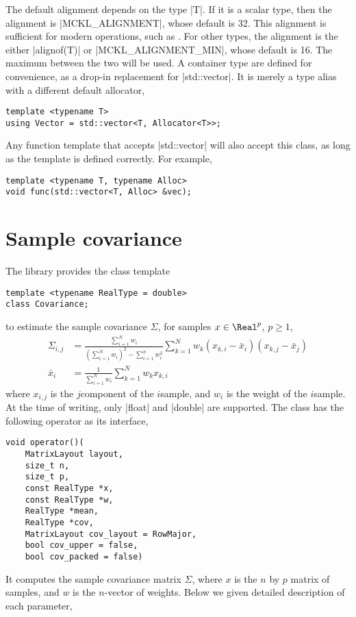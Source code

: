The default alignment depends on the type |T|. If it is a scalar type, then the
alignment is |MCKL_ALIGNMENT|, whose default is 32. This alignment is
sufficient for modern \simd operations, such as \avx. For other types, the
alignment is the either |alignof(T)| or |MCKL_ALIGNMENT_MIN|, whose default is
16. The maximum between the two will be used. A container type are defined for
convenience, as a drop-in replacement for |std::vector|. It is merely a type
alias with a different default allocator,
\begin{verbatim}
template <typename T>
using Vector = std::vector<T, Allocator<T>>;
\end{verbatim}
Any function template that accepts |std::vector| will also accept this class,
as long as the template is defined correctly. For example,
\begin{verbatim}
template <typename T, typename Alloc>
void func(std::vector<T, Alloc> &vec);
\end{verbatim}

\section{Sample covariance}
\label{sec:Sample covariance}

The library provides the class template
\begin{verbatim}
template <typename RealType = double>
class Covariance;
\end{verbatim}
to estimate the sample covariance $\Sigma$, for samples $x\in\Real^p$, $p\ge1$,
\begin{align*}
  \Sigma_{i,j} &= \frac{\sum_{i=1}^N w_i}
  {(\sum_{i=1}^N w_i)^2 - \sum_{i=1}^n w_i^2}
  \sum_{k=1}^N w_k (x_{k,i} - \bar{x}_i)(x_{k,j} - \bar{x}_j) \\
  \bar{x}_i &= \frac{1}{\sum_{i=1}^N w_i}\sum_{k=1}^N w_k x_{k,i}
\end{align*}
where $x_{i,j}$ is the $j$\ith component of the $i$\ith sample, and $w_i$ is
the weight of the $i$\ith sample. At the time of writing, only |float| and
|double| are supported. The class has the following operator as its interface,
\begin{verbatim}
void operator()(
    MatrixLayout layout,
    size_t n,
    size_t p,
    const RealType *x,
    const RealType *w,
    RealType *mean,
    RealType *cov,
    MatrixLayout cov_layout = RowMajor,
    bool cov_upper = false,
    bool cov_packed = false)
\end{verbatim}
It computes the sample covariance matrix $\Sigma$,
where $x$ is the $n$ by $p$ matrix of samples, and $w$ is the $n$-vector of
weights. Below we given detailed description of each parameter,

